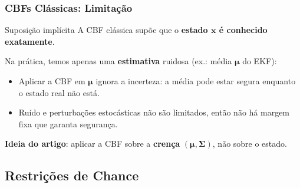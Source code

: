 \begin{frame}

    \frametitle{CBFs Clássicas: Limitação}

    \begin{alertblock}{Suposição implícita}
        A CBF clássica supõe que o \textbf{estado $\boldsymbol{x}$ é conhecido exatamente}.
    \end{alertblock}

    \vspace{2mm}

    Na prática, temos apenas uma \textbf{estimativa} ruidosa (ex.: média $\boldsymbol{\mu}$ do EKF):
    \begin{itemize}
        \item Aplicar a CBF em $\boldsymbol{\mu}$ ignora a incerteza: a média pode estar segura enquanto o estado real não está.
        \item Ruído e perturbações estocásticas não são limitados, então não há margem fixa que garanta segurança.
    \end{itemize}

    \vspace{2mm}

    \centering
    \textbf{Ideia do artigo}: aplicar a CBF sobre a \textbf{crença} $(\boldsymbol{\mu}, \boldsymbol{\Sigma})$, não sobre o estado.

\end{frame}


\subsection{Restrições de Chance}

